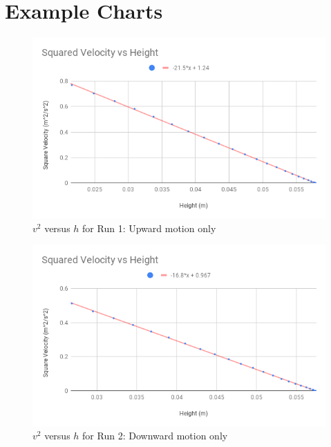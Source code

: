 \section{Example Charts}
%
\begin{figure}[ht]
    \centering
    \includegraphics[scale=0.71]{image/07-mechanic/v2-uphill.png}
    \caption{$v^{2}$ versus $h$ for Run 1: Upward motion only}
    \label{figure:07.v2.1}
\end{figure}
%
\begin{figure}[ht]
    \centering
    \includegraphics[scale=0.71]{image/07-mechanic/v2-downhill.png}
    \caption{$v^{2}$ versus $h$ for Run 2: Downward motion only}
    \label{figure:07.v2.2}
\end{figure}
%
